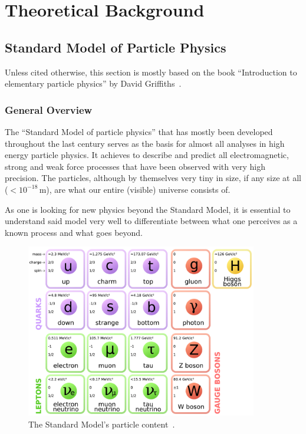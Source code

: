
\chapter{Theoretical Background}
\pagestyle{fancy}
\section{Standard Model of Particle Physics}

Unless cited otherwise, this section is mostly based on the book ``Introduction to elementary particle physics'' by David Griffiths~\cite{griffiths}.

\subsection{General Overview}
\label{sec:stdmdloverview}

The ``Standard Model of particle physics'' that has mostly been developed throughout the last century serves as the basis for almost all analyses in high energy particle physics. It achieves to describe and predict all electromagnetic, strong and weak force processes that have been observed with very high precision. The particles, although by themselves very tiny in size, if any size at all ($< 10^{-18}\,\text{m}$), are what our entire (visible) universe consists of.

As one is looking for new physics beyond the Standard Model, it is essential to understand said model very well to differentiate between what one perceives as a known process and what goes beyond.

\begin{figure}[ht!]
  \centering
    \includegraphics[width=0.9\textwidth]{plots/Standard_Model_of_Elementary_Particles.pdf}
  \caption{The Standard Model's particle content~\cite{stdmdlparticles,pdg}.}
  \label{fig:standardmodel}
\end{figure}

